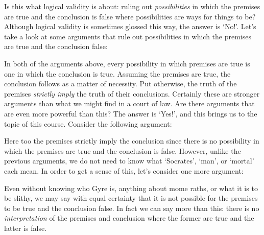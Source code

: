 Is this what logical validity is about: ruling out \textit{possibilities} in which the premises are true and the conclusion is false where possibilities are ways for things to be?
Although logical validity is sometimes glossed this way, the answer is `No!'.
Let's take a look at some arguments that rule out possibilities in which the premises are true and the conclusion false:

\begin{earg}
\end{earg}


\begin{earg}
\end{earg}

In both of the arguments above, every possibility in which premises are true is one in which the conclusion is true.
Assuming the premises are true, the conclusion follows as a matter of necessity.
Put otherwise, the truth of the premises \emph{strictly imply} the truth of their conclusions.
Certainly these are stronger arguments than what we might find in a court of law.
Are there arguments that are even more powerful than this?
The answer is `Yes!', and this brings us to the topic of this course.
Consider the following argument:

\begin{earg}
\end{earg}

Here too the premises strictly imply the conclusion since there is no possibility in which the premises are true and the conclusion is false.
However, unlike the previous arguments, we do not need to know what `Socrates', `man', or `mortal' each mean.
In order to get a sense of this, let's consider one more argument:

\begin{earg}
\end{earg}

Even without knowing who Gyre is, anything about mome raths, or what it is to be slithy, we may say with equal certainty that it is not possible for the premises to be true and the conclusion false.
In fact we can say more than this: there is no \textit{interpretation} of the premises and conclusion where the former are true and the latter is false.


